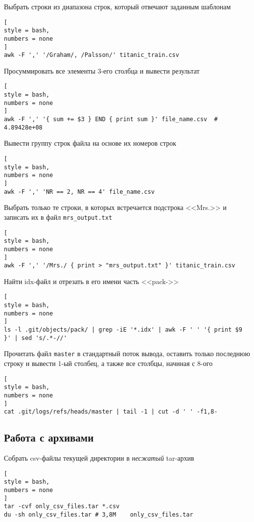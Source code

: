 \documentclass[%
	11pt,
	a4paper,
	utf8,
		]{article}
\begin{document}
Выбрать строки из диапазона строк, который отвечают заданным шаблонам
\begin{lstlisting}[
style = bash,
numbers = none
]
awk -F ',' '/Graham/, /Palsson/' titanic_train.csv
\end{lstlisting}

Просуммировать все элементы 3-его столбца и вывести результат
\begin{lstlisting}[
style = bash,
numbers = none
]
awk -F ',' '{ sum += $3 } END { print sum }' file_name.csv  # 4.89428e+08
\end{lstlisting}

Вывести группу строк файла на основе их номеров строк
\begin{lstlisting}[
style = bash,
numbers = none
]
awk -F ',' 'NR == 2, NR == 4' file_name.csv
\end{lstlisting}

Выбрать только те строки, в которых встречается подстрока <<Mrs.>> и записать их в файл \verb|mrs_output.txt|
\begin{lstlisting}[
style = bash,
numbers = none
]
awk -F ',' '/Mrs./ { print > "mrs_output.txt" }' titanic_train.csv
\end{lstlisting}

Найти idx-файл и отрезать в его имени часть <<pack->>

\begin{lstlisting}[
style = bash,
numbers = none
]
ls -l .git/objects/pack/ | grep -iE '*.idx' | awk -F ' ' '{ print $9 }' | sed 's/.*-//'
\end{lstlisting}

Прочитать файл \texttt{master} в стандартный поток вывода, оставить только последнюю строку и вывести 1-ый столбец, а также все столбцы, начиная с 8-ого
\begin{lstlisting}[
style = bash,
numbers = none
]
cat .git/logs/refs/heads/master | tail -1 | cut -d ' ' -f1,8-
\end{lstlisting}


\subsection{Работа с архивами}

Собрать csv-файлы текущей директории в \emph{несжатый} tar-архив 
\begin{lstlisting}[
style = bash,
numbers = none	
]
tar -cvf only_csv_files.tar *.csv
du -sh only_csv_files.tar # 3,8M	only_csv_files.tar
\end{lstlisting}
\end{document}

